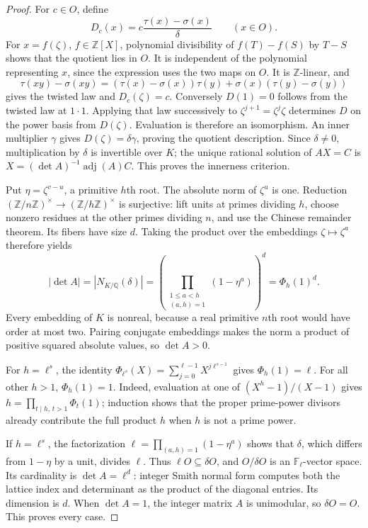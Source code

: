 \documentclass[11pt]{article}
\newcommand{\ZZ}{\mathbb Z}
\newcommand{\QQ}{\mathbb Q}
\newcommand{\FF}{\mathbb F}
\newcommand{\adj}{\operatorname{adj}}
\begin{document}
\begin{proof}
For $c\in O$, define
\[
 D_c(x)=c\frac{\tau(x)-\sigma(x)}{\delta}\qquad(x\in O).
\]
For $x=f(\zeta)$, $f\in\ZZ[X]$, polynomial divisibility of
$f(T)-f(S)$ by $T-S$ shows that the quotient lies in $O$.
It is independent of the polynomial representing $x$, since the
expression uses the two maps on $O$. It is $\ZZ$-linear, and
\[
 \tau(xy)-\sigma(xy)
 =(\tau(x)-\sigma(x))\tau(y)+\sigma(x)(\tau(y)-\sigma(y))
\]
gives the twisted law and $D_c(\zeta)=c$.
Conversely $D(1)=0$ follows from the twisted law at $1\cdot1$.
Applying that law successively to $\zeta^{j+1}=\zeta^j\zeta$ determines
$D$ on the power basis from $D(\zeta)$. Evaluation is therefore an
isomorphism. An inner multiplier $\gamma$ gives
$D(\zeta)=\delta\gamma$, proving the quotient description.
Since $\delta\neq0$, multiplication by $\delta$ is invertible over $K$;
the unique rational solution of $AX=C$ is
$X=(\det A)^{-1}\adj(A)C$. This proves the innerness criterion.

Put $\eta=\zeta^{v-u}$, a primitive $h$th root.
The absolute norm of $\zeta^u$ is one. Reduction
$(\ZZ/n\ZZ)^\times\to(\ZZ/h\ZZ)^\times$ is surjective: lift units
at primes dividing $h$, choose nonzero residues at the other primes
dividing $n$, and use the Chinese remainder theorem. Its fibers have
size $d$. Taking the product over the embeddings
$\zeta\mapsto\zeta^a$ therefore yields
\[
 |\det A|=|N_{K/\QQ}(\delta)|
 =\left(\prod_{\substack{1\leq a<h\\(a,h)=1}}(1-\eta^a)\right)^d
 =\Phi_h(1)^d.
\]
Every embedding of $K$ is nonreal, because a real primitive $n$th root
would have order at most two. Pairing conjugate embeddings makes the
norm a product of positive squared absolute values, so $\det A>0$.

For $h=\ell^s$, the identity
$\Phi_{\ell^s}(X)=\sum_{j=0}^{\ell-1}X^{j\ell^{s-1}}$ gives
$\Phi_h(1)=\ell$. For all other $h>1$, $\Phi_h(1)=1$.
Indeed, evaluation at one of $(X^h-1)/(X-1)$ gives
$h=\prod_{t\mid h,\,t>1}\Phi_t(1)$; induction shows that the proper
prime-power divisors already contribute the full product $h$ when
$h$ is not a prime power.

If $h=\ell^s$, the factorization
$\ell=\prod_{(a,h)=1}(1-\eta^a)$ shows that $\delta$, which differs
from $1-\eta$ by a unit, divides $\ell$. Thus
$\ell O\subseteq\delta O$, and $O/\delta O$ is an $\FF_\ell$-vector
space. Its cardinality is $\det A=\ell^d$: integer Smith normal form
computes both the lattice index and determinant as the product of the
diagonal entries. Its dimension is $d$. When $\det A=1$, the integer
matrix $A$ is unimodular, so $\delta O=O$. This proves every case.
\end{proof}
\end{document}
